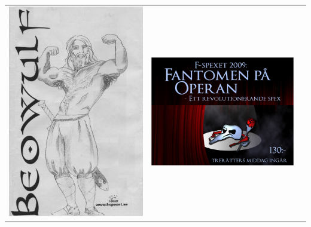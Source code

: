 \begin{tabular}{c c c}
\includegraphics[height=\gamlaAffischerHeight]{Bilder/TidigareSpexloggor/BeowulfBra.jpg} &
\includegraphics[width=\gamlaAffischerHeight]{Bilder/TidigareSpexloggor/Logga_fantomen} &

\end{tabular}
